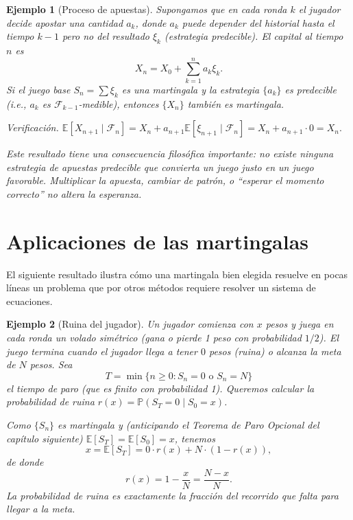 \documentclass[12pt]{book}
\newtheorem{example}{Ejemplo}[chapter]
\begin{document}
\begin{example}[Proceso de apuestas]
    Supongamos que en cada ronda $k$ el jugador decide apostar una cantidad $a_k$, donde $a_k$ puede depender del historial hasta el tiempo $k-1$ pero \emph{no} del resultado $\xi_k$ (estrategia \emph{predecible}). El capital al tiempo $n$ es
    \[
        X_n = X_0 + \sum_{k=1}^n a_k \xi_k.
    \]
    Si el juego base $S_n = \sum \xi_k$ es una martingala y la estrategia $\{a_k\}$ es predecible (i.e., $a_k$ es $\mathcal{F}_{k-1}$-medible), entonces $\{X_n\}$ también es martingala.

    \smallskip
    \textit{Verificación.} $\mathbb{E}[X_{n+1} \mid \mathcal{F}_n] = X_n + a_{n+1}\mathbb{E}[\xi_{n+1} \mid \mathcal{F}_n] = X_n + a_{n+1} \cdot 0 = X_n.$

    \smallskip
    Este resultado tiene una consecuencia filosófica importante: \emph{no existe ninguna estrategia de apuestas predecible que convierta un juego justo en un juego favorable}. Multiplicar la apuesta, cambiar de patrón, o ``esperar el momento correcto'' no altera la esperanza.
\end{example}


\section{Aplicaciones de las martingalas}

El siguiente resultado ilustra cómo una martingala bien elegida resuelve en pocas líneas un problema que por otros métodos requiere resolver un sistema de ecuaciones.

\begin{example}[Ruina del jugador]
\label{ej:ruina}
    Un jugador comienza con $x$ pesos y juega en cada ronda un volado \emph{simétrico} (gana o pierde 1 peso con probabilidad $1/2$). El juego termina cuando el jugador llega a tener $0$ pesos (ruina) o alcanza la meta de $N$ pesos. Sea
    \[
        T = \min\{n \ge 0 : S_n = 0 \text{ o } S_n = N\}
    \]
    el tiempo de paro (que es finito con probabilidad 1). Queremos calcular la probabilidad de ruina $r(x) = \mathbb{P}(S_T = 0 \mid S_0 = x)$.

    \smallskip
    Como $\{S_n\}$ es martingala y (anticipando el Teorema de Paro Opcional del capítulo siguiente) $\mathbb{E}[S_T] = \mathbb{E}[S_0] = x$, tenemos
    \[
        x = \mathbb{E}[S_T] = 0 \cdot r(x) + N \cdot (1 - r(x)),
    \]
    de donde
    \[
        \boxed{r(x) = 1 - \frac{x}{N} = \frac{N-x}{N}}.
    \]
    La probabilidad de ruina es exactamente la fracción del recorrido que falta para llegar a la meta.
\end{example}
\end{document}
